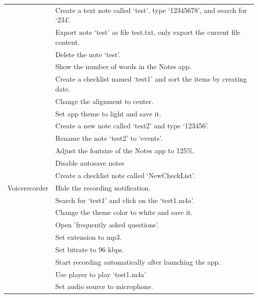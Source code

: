 \begin{longtable}{|p{1.8cm}|p{10.5cm}|}
      & Create a text note called `test', type `12345678', and search for `234'. \\
      & Export note `test' as file test.txt, only export the current file content. \\
      & Delete the note `test'. \\
      & Show the number of words in the Notes app. \\
      & Create a checklist named `test1' and sort the items by creating date. \\
      & Change the alignment to center. \\
      & Set app theme to light and save it. \\
      & Create a new note called `test2' and type `123456'. \\
      & Rename the note `test2' to `events'. \\
      & Adjust the fontsize of the Notes app to 125\%. \\
      & Disable autosave notes \\
      \hline
      & Create a checklist note called `NewCheckList'. \\
\hline
Voicerecorder & Hide the recording notification. \\
              & Search for `test1' and click on the `test1.m4a'. \\
              & Change the theme color to white and save it. \\
              & Open 'frequently asked questions'. \\
              & Set extension to mp3. \\
              & Set bitrate to 96 kbps. \\
              & Start recording automatically after launching the app. \\
              & Use player to play `test1.m4a' \\
              & Set audio source to microphone. \\
\hline
\end{longtable}

